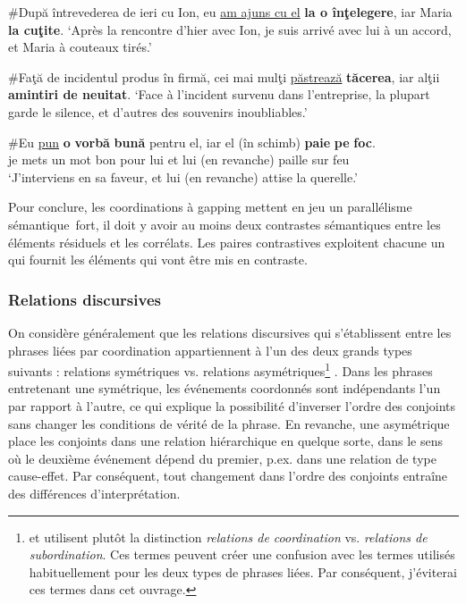 \ex \#După întrevederea de ieri cu Ion, eu \uline{am ajuns cu el} \textbf{la o înţelegere}, iar Maria \textbf{la cuţite}. 
\glt ‘Après la rencontre d’hier avec Ion, je suis arrivé avec lui à un accord, et Maria à couteaux tirés.’

\ex \#Faţă de incidentul produs în firmă, cei mai mulţi \uline{păstrează} \textbf{tăcerea}, iar alţii \textbf{amintiri de neuitat}. 
\glt ‘Face à l’incident survenu dans l’entreprise, la plupart garde le silence, et d’autres des souvenirs inoubliables.’

\ex 
\gll \#Eu \uline{pun} \textbf{o} \textbf{vorbă} \textbf{bună} pentru  el,  iar  el  (în  schimb) \textbf{paie} \textbf{pe} \textbf{foc}.\\ 
je  mets  un  mot  bon  pour  lui  et  lui  (en  revanche)  paille  sur  feu\\
\glt ‘J’interviens en sa faveur, et lui (en revanche) attise la querelle.’   
\z
\z

Pour conclure, les coordinations à gapping mettent en jeu un parallélisme sémantique~fort, {\cad} il doit y avoir au moins deux contrastes sémantiques entre les éléments résiduels et les corrélats. Les paires contrastives exploitent chacune un  qui fournit les éléments qui vont être mis en contraste. 


\subsubsection{Relations discursives} \label{ch2:sect2.3.4.3}


On considère généralement que les relations discursives qui s’établissent entre les phrases liées par coordination appartiennent à l’un des deux grands types suivants : relations symétriques vs. relations asymétriques\footnote{
 \citet{Asher1993} et \citet{AsherEtAl2003} utilisent plutôt la distinction \textit{relations de coordination} vs. \textit{relations de subordination}. Ces termes peuvent créer une confusion avec les termes utilisés habituellement pour les deux types de phrases liées. Par conséquent, j’éviterai ces termes dans cet ouvrage.} \citep{Asher1993,AsherEtAl2003,Kehler1996,Kehler2000,Kehler2002}. Dans les phrases entretenant une  symétrique, les événements coordonnés sont indépendants l’un par rapport à l’autre, ce qui explique la possibilité d’inverser l’ordre des conjoints sans changer les conditions de vérité de la phrase. En revanche, une  asymétrique place les conjoints dans une relation hiérarchique en quelque sorte, dans le sens où le deuxième événement dépend du premier, p.ex. dans une relation de type cause-effet. Par conséquent, tout changement dans l’ordre des conjoints entraîne des différences d’interprétation.  


